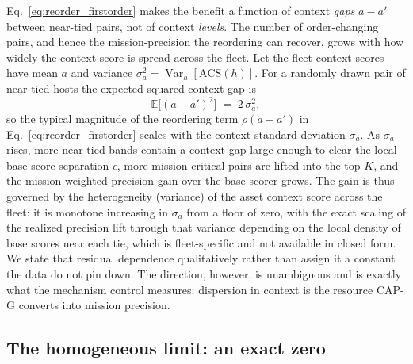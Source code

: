 Eq.~\ref{eq:reorder_firstorder} makes the benefit a function of context
\emph{gaps} $a-a'$ between near-tied pairs, not of context \emph{levels}. The
number of order-changing pairs, and hence the mission-precision the reordering
can recover, grows with how widely the context score is spread across the fleet.
Let the fleet context scores have mean $\bar a$ and variance
$\sigma_a^2=\operatorname{Var}_h[\mathrm{ACS}(h)]$. For a randomly drawn pair of
near-tied hosts the expected squared context gap is
%
\begin{equation}
\label{eq:gap_variance}
\mathbb{E}\bigl[(a-a')^2\bigr]\;=\;2\,\sigma_a^2,
\end{equation}
%
so the typical magnitude of the reordering term $\rho(a-a')$ in
Eq.~\ref{eq:reorder_firstorder} scales with the context standard deviation
$\sigma_a$. As $\sigma_a$ rises, more near-tied bands contain a context gap large
enough to clear the local base-score separation $\epsilon$, more mission-critical
pairs are lifted into the top-$K$, and the mission-weighted precision gain over
the base scorer grows. The gain is thus governed by the heterogeneity (variance)
of the asset context score across the fleet: it is monotone increasing in
$\sigma_a$ from a floor of zero, with the exact scaling of the realized
precision lift through that variance depending on the local density of base
scores near each tie, which is fleet-specific and not available in closed form.
We state that residual dependence qualitatively rather than assign it a constant
the data do not pin down. The direction, however, is unambiguous and is exactly
what the mechanism control measures: dispersion in context is the resource CAP-G
converts into mission precision.

\subsection{The homogeneous limit: an exact zero}
\label{sec:theory_homogeneous}

